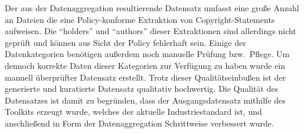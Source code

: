 Der aus der Datenaggregation resultierende Datensatz umfasst eine große Anzahl an Dateien die eine Policy-konforme Extraktion von Copyright-Statements aufweisen.
Die \enquote{holders} und \enquote{authors} dieser Extraktionen sind allerdings nicht geprüft und können aus Sicht der Policy fehlerhaft sein.
Einige der Datenkategorien benötigen außerdem noch manuelle Prüfung bzw.\ Pflege.
Um dennoch korrekte Daten dieser Kategorien zur Verfügung zu haben wurde ein manuell überprüfter Datensatz erstellt.
Trotz dieser Qualitätseinbußen ist der generierte und kuratierte Datensatz qualitativ hochwertig.
Die Qualität des Datensatzes ist damit zu begründen, dass der Ausgangsdatensatz mithilfe des Toolkits erzeugt wurde, welches der aktuelle Industriestandard ist, und anschließend in Form der Datenaggregation Schrittweise verbessert wurde.
